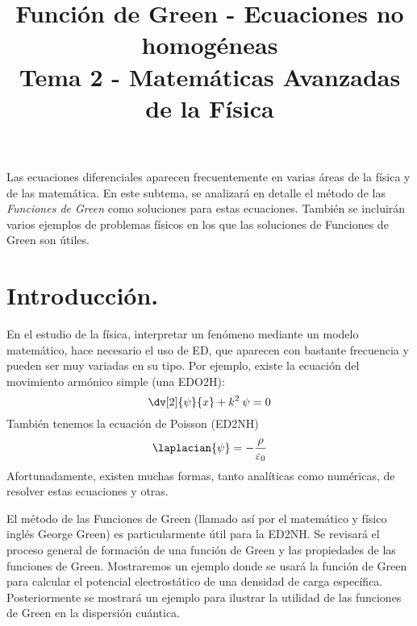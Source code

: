 
\author{}
\title{Función de Green - Ecuaciones no homogéneas \\ \large {Tema 2 - Matemáticas Avanzadas de la Física}}
\date{}

\renewcommand\labelenumii{\theenumi.{\arabic{enumii}}}
\maketitle
\fontsize{14}{14}\selectfont
Las ecuaciones diferenciales aparecen frecuentemente en varias áreas de la física y de las matemática. En este subtema, se analizará en detalle el método de las \emph{Funciones de Green} como soluciones para estas ecuaciones. También se incluirán varios ejemplos de problemas físicos en los que las soluciones de Funciones de Green son útiles.
\section{Introducción.}
En el estudio de la física, interpretar un fenómeno mediante un modelo matemático, hace necesario el uso de ED, que aparecen con bastante frecuencia y pueden ser muy variadas en su tipo. Por ejemplo, existe la ecuación del movimiento armónico simple (una EDO2H):
\begin{equation}
\dv[2]{\psi}{x} + k^{2} \: \psi = 0
\label{eq:ecuacion_01}
\end{equation}
También tenemos la ecuación de Poisson (ED2NH)
\begin{equation}
\laplacian{\psi} = - \dfrac{\rho}{\varepsilon_{0}}
\label{eq:ecuacion_02}
\end{equation}
Afortunadamente, existen muchas formas, tanto analíticas como numéricas, de resolver estas ecuaciones y otras.
\par
El método de las Funciones de Green (llamado así por el matemático y físico inglés George Green) es particularmente útil para la ED2NH. Se revisará el proceso general de formación de una función de Green y las propiedades de las funciones de Green. Mostraremos un ejemplo donde se usará la función de Green para calcular el potencial electrostático de una densidad de carga específica. Posteriormente se mostrará un ejemplo para ilustrar la utilidad de las funciones de Green en la dispersión cuántica.
